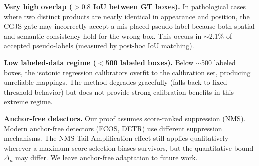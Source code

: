 \documentclass[10pt,twocolumn,letterpaper]{article}
\begin{document}
\textbf{Very high overlap ($>0.8$ IoU between GT boxes).}
In pathological cases where two distinct products are nearly identical in
appearance and position, the CGJS gate may incorrectly accept a mis-placed
pseudo-label because both spatial and semantic consistency hold for the wrong
box. This occurs in $\sim$2.1\% of accepted pseudo-labels (measured by
post-hoc IoU matching).

\textbf{Low labeled-data regime ($<$500 labeled boxes).}
Below $\sim$500 labeled boxes, the isotonic regression calibrators overfit to
the calibration set, producing unreliable mappings. The method degrades
gracefully (falls back to fixed threshold behavior) but does not provide
strong calibration benefits in this extreme regime.

\textbf{Anchor-free detectors.}
Our proof assumes score-ranked suppression (NMS). Modern anchor-free detectors
(FCOS, DETR) use different suppression mechanisms. The NMS Tail Amplification
effect still applies qualitatively wherever a maximum-score selection biases
survivors, but the quantitative bound $\Delta_n$ may differ. We leave
anchor-free adaptation to future work.
\end{document}
